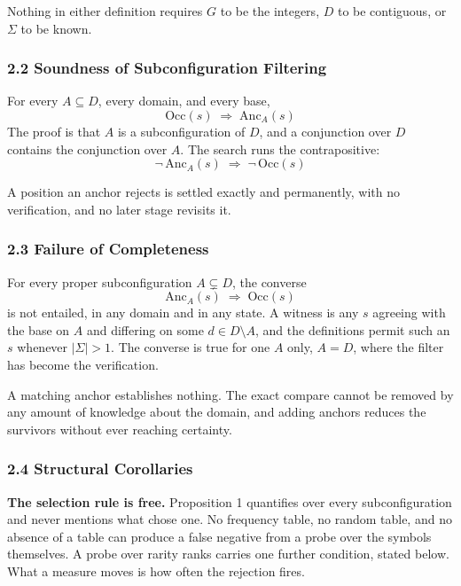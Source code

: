 Nothing in either definition requires \(G\) to be the integers, \(D\) to be contiguous, or \(\Sigma\) to be known.

\subsubsection{2.2 Soundness of Subconfiguration Filtering}

For every \(A \subseteq D\), every domain, and every base,
\[
  \mathrm{Occ}(s) \;\Longrightarrow\; \mathrm{Anc}_A(s)
\]
The proof is that \(A\) is a subconfiguration of \(D\), and a conjunction over \(D\) contains the conjunction over \(A\). The search runs the contrapositive:
\[
  \neg\,\mathrm{Anc}_A(s) \;\Longrightarrow\; \neg\,\mathrm{Occ}(s)
\]

A position an anchor rejects is settled exactly and permanently, with no verification, and no later stage revisits it.

\subsubsection{2.3 Failure of Completeness}

For every proper subconfiguration \(A \subsetneq D\), the converse
\[
  \mathrm{Anc}_A(s) \;\Longrightarrow\; \mathrm{Occ}(s)
\]
is not entailed, in any domain and in any state. A witness is any \(s\) agreeing with the base on \(A\) and differing on some \(d \in D \setminus A\), and the definitions permit such an \(s\) whenever \(|\Sigma| > 1\). The converse is true for one \(A\) only, \(A = D\), where the filter has become the verification.

A matching anchor establishes nothing. The exact compare cannot be removed by any amount of knowledge about the domain, and adding anchors reduces the survivors without ever reaching certainty.

\subsubsection{2.4 Structural Corollaries}

\noindent\textbf{The selection rule is free.} Proposition 1 quantifies over every subconfiguration and never mentions what chose one. No frequency table, no random table, and no absence of a table can produce a false negative from a probe over the symbols themselves. A probe over rarity ranks carries one further condition, stated below. What a measure moves is how often the rejection fires.

